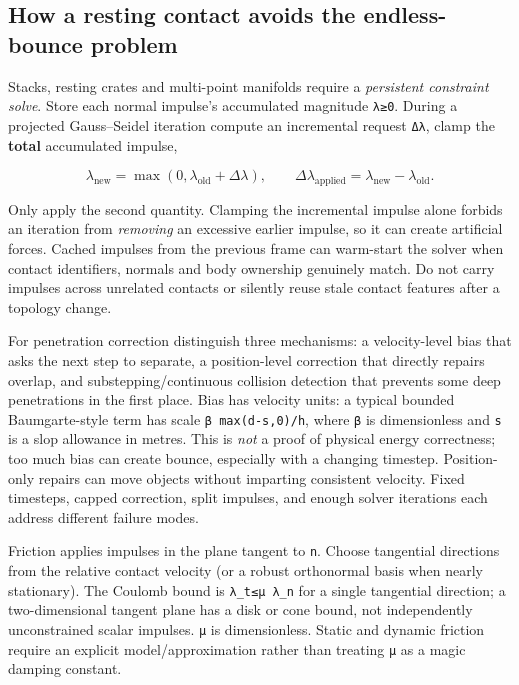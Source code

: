 \subsection{How a resting contact avoids the endless-bounce problem}\label{how-a-resting-contact-avoids-the-endless-bounce-problem}

Stacks, resting crates and multi-point manifolds require a \emph{persistent constraint solve}. Store each normal impulse's accumulated magnitude \texttt{λ≥0}. During a projected Gauss--Seidel iteration compute an incremental request \texttt{Δλ}, clamp the \textbf{total} accumulated impulse,

\[
\lambda_{\mathrm{new}}=\max(0,\lambda_{\mathrm{old}}+\Delta\lambda),\qquad
\Delta\lambda_{\mathrm{applied}}=\lambda_{\mathrm{new}}-\lambda_{\mathrm{old}}.
\]

Only apply the second quantity. Clamping the incremental impulse alone forbids an iteration from \emph{removing} an excessive earlier impulse, so it can create artificial forces. Cached impulses from the previous frame can warm-start the solver when contact identifiers, normals and body ownership genuinely match. Do not carry impulses across unrelated contacts or silently reuse stale contact features after a topology change.

For penetration correction distinguish three mechanisms: a velocity-level bias that asks the next step to separate, a position-level correction that directly repairs overlap, and substepping/continuous collision detection that prevents some deep penetrations in the first place. Bias has velocity units: a typical bounded Baumgarte-style term has scale \texttt{β\ max(d-s,0)/h}, where \texttt{β} is dimensionless and \texttt{s} is a slop allowance in metres. This is \emph{not} a proof of physical energy correctness; too much bias can create bounce, especially with a changing timestep. Position-only repairs can move objects without imparting consistent velocity. Fixed timesteps, capped correction, split impulses, and enough solver iterations each address different failure modes.

Friction applies impulses in the plane tangent to \texttt{n}. Choose tangential directions from the relative contact velocity (or a robust orthonormal basis when nearly stationary). The Coulomb bound is \texttt{\textbar{}λ\_t\textbar{}≤μ\ λ\_n} for a single tangential direction; a two-dimensional tangent plane has a disk or cone bound, not independently unconstrained scalar impulses. \texttt{μ} is dimensionless. Static and dynamic friction require an explicit model/approximation rather than treating \texttt{μ} as a magic damping constant.

